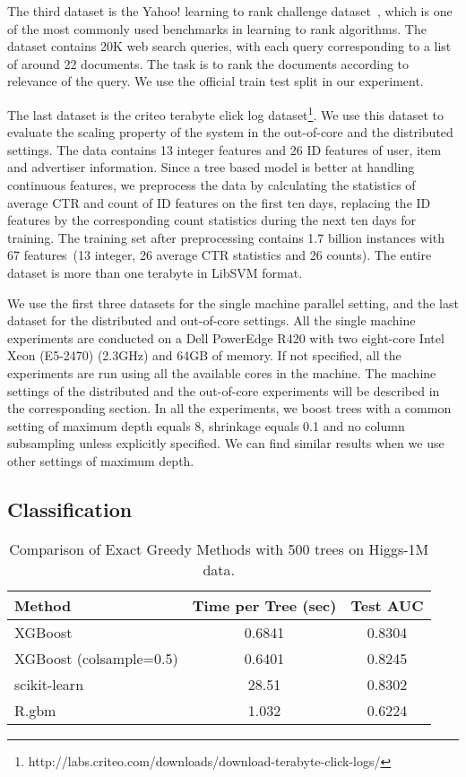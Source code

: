 \documentclass{sig-alternate-05-2015}
\begin{document}
The third dataset is the Yahoo! learning to rank challenge dataset~\cite{YahooLTRC}, which is one of the most commonly used benchmarks in learning to rank algorithms.
The dataset contains 20K web search queries, with each query corresponding to a list of around 22 documents.
The task is to rank the documents according to relevance of the query.
We use the official train test split in our experiment.

The last dataset is the criteo terabyte click log dataset\footnote{http://labs.criteo.com/downloads/download-terabyte-click-logs/}.
We use this dataset to evaluate the scaling property of the system in the out-of-core and the distributed settings.
The data contains 13 integer features and 26 ID features of user, item and advertiser information.
Since a tree based model is better at handling continuous features,
we preprocess the data by calculating the statistics of average CTR and count of ID features on the first ten days,  replacing the ID features by the corresponding count statistics during the next ten days for training.
The training set after preprocessing contains 1.7 billion instances with 67 features~(13 integer, 26 average CTR statistics and 26 counts).
The entire dataset is more than one terabyte in LibSVM format.

We use the first three datasets for the single machine parallel setting, and the last dataset for the distributed and out-of-core settings.
All the single machine experiments are conducted on a Dell PowerEdge R420 with two eight-core Intel Xeon (E5-2470) (2.3GHz) and 64GB of memory.
If not specified, all the experiments are run using all the available cores in the machine.
The machine settings of the distributed and the out-of-core experiments will be described in the corresponding section.
In all the experiments, we boost trees with a common setting of maximum depth equals 8, shrinkage equals 0.1
and no column subsampling unless explicitly specified.
We can find similar results when we use other settings of maximum depth.

\subsection{Classification}
\begin{table}[t!]
\centering
\caption{Comparison of Exact Greedy Methods with 500 trees on Higgs-1M data.}\label{tbl:higgs-cmp}
\begin{tabular}{|l|c|c|}\hline
  Method & Time per Tree (sec) & Test AUC   \\ \hline
  XGBoost  &  0.6841 &  0.8304 \\ \hline
  XGBoost (colsample=0.5) & 0.6401 & 0.8245 \\ \hline
  scikit-learn  & 28.51  & 0.8302  \\ \hline
  R.gbm    &  1.032 &  0.6224  \\ \hline
\end{tabular}
\end{table}
\end{document}
